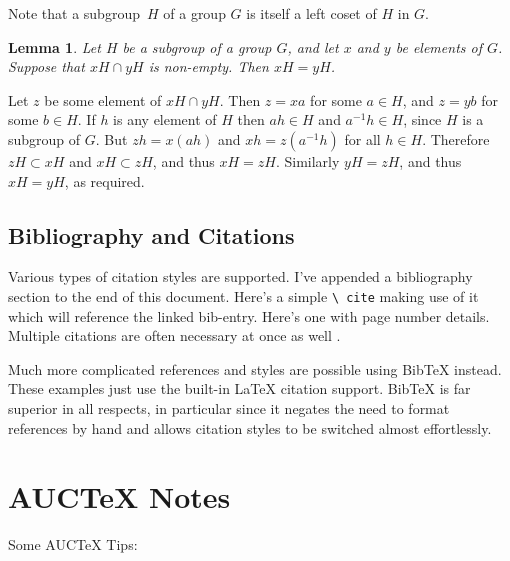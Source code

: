 \documentclass[a4paper,12pt]{article}
\newtheorem{lemma}[theorem]{Lemma}
\newenvironment{proof}[1][Proof]{\begin{trivlist}
\item[\hskip \labelsep {\bfseries #1}]}{\end{trivlist}}
\newcommand{\qed}{\nobreak \ifvmode \relax \else
  \ifdim\lastskip<1.5em \hskip-\lastskip
  \hskip1.5em plus0em minus0.5em \fi \nobreak
  \vrule height0.75em width0.5em depth0.25em\fi}
\begin{document}
Note that a subgroup~$H$ of a group $G$ is itself a left coset of $H$ in $G$.

\begin{lemma}
  \label{LeftCosetsDisjoint}
  Let $H$ be a subgroup of a group $G$, and let $x$ and $y$ be elements of $G$.
  Suppose that $xH \cap yH$ is non-empty.  Then $xH = yH$.
\end{lemma}
    
\begin{proof}
  Let $z$ be some element of $xH \cap yH$.  Then $z = xa$ for some $a \in H$,
  and $z = yb$ for some $b \in H$.  If $h$ is any element of $H$ then $ah \in
  H$ and $a^{-1}h \in H$, since $H$ is a subgroup of $G$.  But $zh = x(ah)$ and
  $xh = z(a^{-1}h)$ for all $h \in H$.  Therefore $zH \subset xH$ and $xH
  \subset zH$, and thus $xH = zH$.  Similarly $yH = zH$, and thus $xH = yH$, as
  required.\qed
\end{proof}

\subsection{Bibliography and Citations}

Various types of citation styles are supported.  I've appended a bibliography
section to the end of this document.  Here's a simple \texttt{\textbackslash
  cite} making use of it \cite{Erdos01} which will reference the linked
bib-entry.  Here's one \cite[p. 215]{ConcreteMath} with page number details.
Multiple citations are often necessary at once as well \cite{ConcreteMath,
  Knuth92}.

Much more complicated references and styles are possible using BibTeX instead.
These examples just use the built-in \LaTeX{} citation support.  BibTeX is far
superior in all respects, in particular since it negates the need to format
references by hand and allows citation styles to be switched almost
effortlessly.

\section{AUCTeX Notes}

Some AUCTeX Tips:
\end{document}
